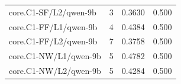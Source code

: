\begin{longtable}{@{}lrrr@{}}
core.\allowbreak C1-SF/\allowbreak L2/\allowbreak qwen-9b & 3 & 0.3630 & 0.500\\
core.\allowbreak C1-FF/\allowbreak L1/\allowbreak qwen-9b & 4 & 0.4384 & 0.500\\
core.\allowbreak C1-FF/\allowbreak L2/\allowbreak qwen-9b & 7 & 0.3758 & 0.500\\
core.\allowbreak C1-NW/\allowbreak L1/\allowbreak qwen-9b & 5 & 0.4782 & 0.500\\
core.\allowbreak C1-NW/\allowbreak L2/\allowbreak qwen-9b & 5 & 0.4284 & 0.500\\
\end{longtable}\endgroup
